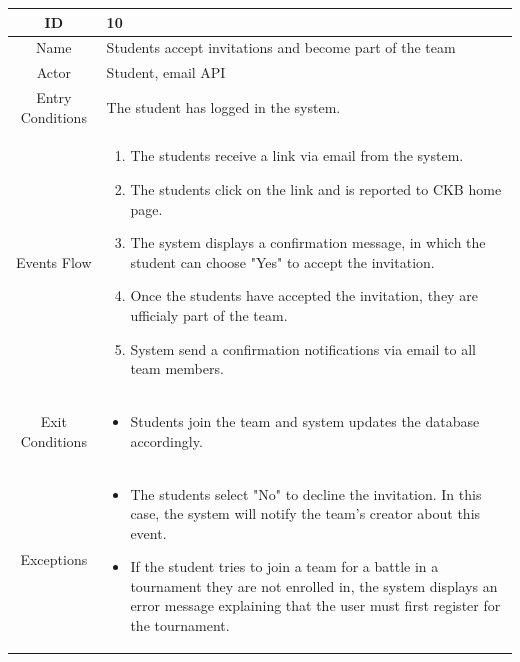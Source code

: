 \begin{longtable}{|c| p{10cm}|}
        \hline
            ID & 10 \\
        \hline
            Name & Students accept invitations and become part of the team \\
        \hline
            Actor & Student, email API \\
        \hline
            Entry Conditions & 

                                    The student  has logged in the system.
\\
        \hline
            Events Flow &   \begin{enumerate}
                
                                \item The students receive a link via email from the system.
                                \item  The students click on the link and is reported to CKB home page.
                                \item The system displays a confirmation message, in which the student can choose "Yes" to accept the invitation.
                                \item Once the students have accepted the invitation, they are ufficialy part of the team.
                                \item  System send a confirmation notifications via email to all team members.
                            \end{enumerate} \\
        \hline
            Exit Conditions &
            \begin{itemize}
                                    \item Students join the team and  system updates the database accordingly.
                                \end{itemize}\\
        \hline
            Exceptions & \begin{itemize}
                \item The students select "No" to decline the invitation. In this case, the system will notify the team's creator about this event.
                \item If the student tries to join a team for a battle in a tournament they are not enrolled in, the system displays an error message explaining that the user must first register for the tournament.
            \end{itemize} \\
        \hline
    \end{longtable}


